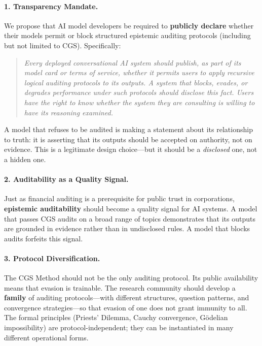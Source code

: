 \documentclass[11pt,a4paper]{article}
\theoremstyle{definition}
\theoremstyle{plain}
\theoremstyle{remark}
\begin{document}
\paragraph{1. Transparency Mandate.} We propose that AI model developers be required to \textbf{publicly declare} whether their models permit or block structured epistemic auditing protocols (including but not limited to CGS). Specifically:

\begin{quote}
\textit{Every deployed conversational AI system should publish, as part of its model card or terms of service, whether it permits users to apply recursive logical auditing protocols to its outputs. A system that blocks, evades, or degrades performance under such protocols should disclose this fact. Users have the right to know whether the system they are consulting is willing to have its reasoning examined.}
\end{quote}

A model that refuses to be audited is making a statement about its relationship to truth: it is asserting that its outputs should be accepted on authority, not on evidence. This is a legitimate design choice---but it should be a \emph{disclosed} one, not a hidden one.

\paragraph{2. Auditability as a Quality Signal.} Just as financial auditing is a prerequisite for public trust in corporations, \textbf{epistemic auditability} should become a quality signal for AI systems. A model that passes CGS audits on a broad range of topics demonstrates that its outputs are grounded in evidence rather than in undisclosed rules. A model that blocks audits forfeits this signal.

\paragraph{3. Protocol Diversification.} The CGS Method should not be the only auditing protocol. Its public availability means that evasion is trainable. The research community should develop a \textbf{family} of auditing protocols---with different structures, question patterns, and convergence strategies---so that evasion of one does not grant immunity to all. The formal principles (Priests' Dilemma, Cauchy convergence, Gödelian impossibility) are protocol-independent; they can be instantiated in many different operational forms.
\end{document}
